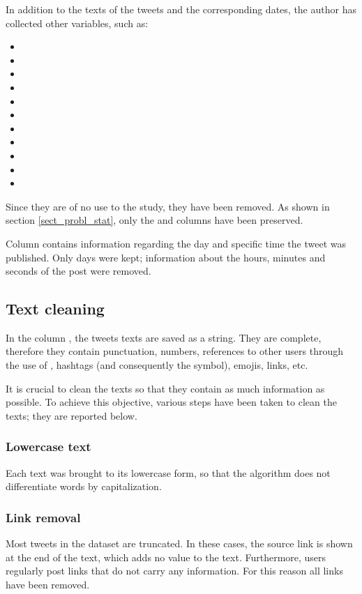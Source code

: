 In addition to the texts of the tweets and the corresponding dates, the author has collected other variables, such as: 
\begin{itemize}
  \item {}
  \item {}
  \item {}
  \item {}
  \item {}
  \item {}
  \item {}
  \item {}
  \item {}
  \item {}
  \item {}
\end{itemize}

Since they are of no use to the study, they have been removed. As shown in section \ref{sect_probl_stat}, only the  and  columns have been preserved.

Column  contains information regarding the day and specific time the tweet was published. Only days were kept; information about the hours, minutes and seconds of the post were removed.

\subsection*{Text cleaning}

In the column , the tweets texts are saved as a string. They are complete, therefore they contain punctuation, numbers, references to other users through the use of , hashtags (and consequently the \code{\#} symbol), emojis, links, etc.

It is crucial to clean the texts so that they contain as much information as possible. To achieve this objective, various steps have been taken to clean the texts; they are reported below.

\subsubsection*{Lowercase text}
Each text was brought to its lowercase form, so that the algorithm does not differentiate words by capitalization.

\subsubsection*{Link removal}
Most tweets in the dataset are truncated. In these cases, the source link is shown at the end of the text, which adds no value to the text. Furthermore, users regularly post links that do not carry any information. For this reason all links have been removed.


